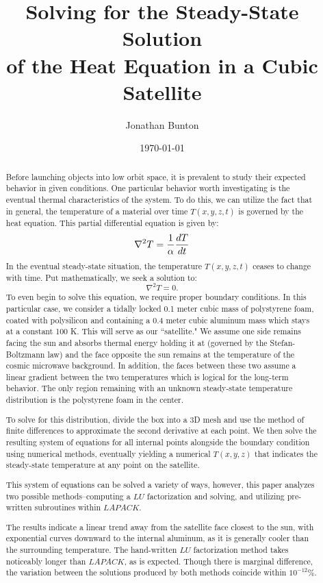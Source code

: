 \documentclass[12pt]{article}
\author{Jonathan Bunton}
\title{Solving for the Steady-State Solution \\ of the Heat Equation in a Cubic Satellite}
\date{\today}
\begin{document}
\maketitle
\onehalfspacing
\begin{abstract}
Before launching objects into low orbit space, it is prevalent to study their expected behavior in given conditions.  One particular behavior worth investigating is the eventual thermal characteristics of the system.  To do this, we can utilize the fact that in general, the temperature of a material over time $T(x,y,z,t)$ is governed by the heat equation. \cite{heateq} This partial differential equation is given by:
\begin{equation*}
\nabla^2T = \frac{1}{\alpha}\dv{T}{t}
\end{equation*}
In the eventual steady-state situation, the temperature $T(x,y,z,t)$ ceases to change with time.  Put mathematically, we seek a solution to:
\begin{equation*}
\nabla^2T = 0.
\end{equation*}
To even begin to solve this equation, we require proper boundary conditions. In this particular case, we consider a tidally locked 0.1 meter cubic mass of polystyrene foam, coated with polysilicon and containing a 0.4 meter cubic aluminum mass which stays at a constant 100 K.  This will serve as our ``satellite."  We assume one side remains facing the sun and absorbs thermal energy holding it at  (governed by the Stefan-Boltzmann law) and the face opposite the sun remains at the temperature of the cosmic microwave background. \cite{cmb,sblaw}  In addition, the faces between these two assume a linear gradient between the two temperatures which is logical for the long-term behavior. The only region remaining with an unknown steady-state temperature distribution is the polystyrene foam in the center.

To solve for this distribution, divide the box into a 3D mesh and use the method of finite differences to approximate the second derivative at each point.  We then solve the resulting system of equations for all internal points alongside the boundary condition using numerical methods, eventually yielding a numerical $T(x,y,z)$ that indicates the steady-state temperature at any point on the satellite.

This system of equations can be solved a variety of ways, however, this paper analyzes two possible methods--computing a $LU$ factorization and solving, and utilizing pre-written subroutines within $LAPACK$. \cite{lu,LAPACK}

The results indicate a linear trend away from the satellite face closest to the sun, with exponential curves downward to the internal aluminum, as it is generally cooler than the surrounding temperature.  The hand-written $LU$ factorization method takes noticeably longer than $LAPACK$, as is expected.  Though there is marginal difference, the variation between the solutions produced by both methods coincide within $10^{-12}\%$.
\end{abstract}
\end{document}
